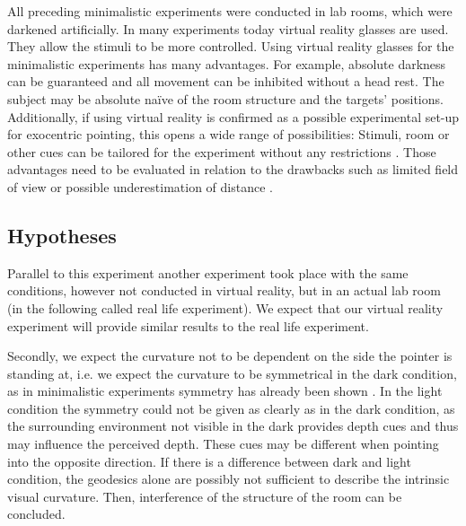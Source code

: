 All preceding minimalistic experiments \cite{Zajackowska1956., Indow.1991} %
were conducted in lab rooms, which were darkened artificially. In many experiments today virtual reality glasses are used. They allow the stimuli to be more controlled. Using virtual reality glasses for the minimalistic experiments has many advantages. For example, absolute darkness can be guaranteed and all movement can be inhibited without a head rest. The subject may be absolute na\"{i}ve of the room structure and the targets' positions. Additionally, if using virtual reality is confirmed as a possible experimental set-up for exocentric pointing, this opens a wide range of possibilities: Stimuli, room or other cues can be tailored for the experiment without any restrictions \cite{Gaggioli.2001}. Those advantages need to be evaluated in relation to the drawbacks such as limited field of view or possible underestimation of distance \cite{Interrante.2008}.

\subsection{Hypotheses}
Parallel to this experiment another experiment took place with the same conditions, however not conducted in virtual reality, but in an actual lab room (in the following called real life experiment). We expect that our virtual reality experiment will provide similar results to the real life experiment.

Secondly, we expect the curvature not to be dependent on the side the pointer is standing at, i.e. we expect the curvature to be symmetrical in the dark condition, as in minimalistic experiments symmetry has already been shown \cite{Indow.1991}. In the light condition the symmetry could not be given as clearly as in the dark condition, as the surrounding environment not visible in the dark provides depth cues and thus may influence the perceived depth. These cues may be different when pointing into the opposite direction. 
If there is a difference between dark and light condition, the geodesics alone are possibly not sufficient to describe the intrinsic visual curvature. Then, interference of the structure of the room can be concluded.

